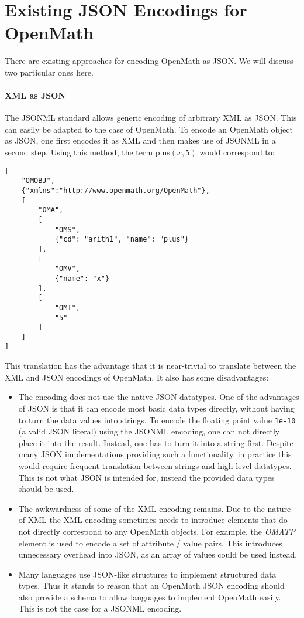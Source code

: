 \section{Existing JSON Encodings for OpenMath}\label{sec:ex}

There are existing approaches for encoding OpenMath as JSON.  We will discuss two
particular ones here.

\paragraph{XML as JSON}
The JSONML standard\cite{jsonml:webpage} allows generic encoding of arbitrary XML as JSON. 
This can easily be adapted to the case of OpenMath. 
To encode an OpenMath object as JSON, one first encodes it as XML and then makes use of JSONML in a second step. 
Using this method, the term $\mathrm{plus}(x, 5)$ would correspond to: 
\begin{lstlisting}
[
    "OMOBJ",
    {"xmlns":"http://www.openmath.org/OpenMath"},
    [
        "OMA",
        [
            "OMS", 
            {"cd": "arith1", "name": "plus"}
        ],
        [
            "OMV", 
            {"name": "x"}
        ],
        [
            "OMI", 
            "5"
        ]
    ]
]
\end{lstlisting}

This translation has the advantage that it is near-trivial to translate between the XML and JSON encodings of OpenMath. 
It also has some disadvantages: 

\begin{itemize}
    \item The encoding does not use the native JSON datatypes. 
    One of the advantages of JSON is that it can encode most basic data types directly, without having to turn the data values into strings. 
    To encode the floating point value \lstinline{1e-10} (a valid JSON literal) using the JSONML encoding, one can not directly place it into the result. 
    Instead, one has to turn it into a string first.   
    Despite many JSON implementations providing such a functionality, in practice this would require frequent translation between strings and high-level datatypes.  
    This is not what JSON is intended for, instead the provided data types should be used. 

    \item The awkwardness of some of the XML encoding remains. 
    Due to the nature of XML the XML encoding sometimes needs to introduce elements that do not directly correspond to any OpenMath objects. 
    For example, the \textit{OMATP} element is used to encode a set of attribute / value pairs. 
    This introduces unnecessary overhead into JSON, as an array of values could be used instead. 

    \item Many languages use JSON-like structures to implement structured data types. 
    Thus it stands to reason that an OpenMath JSON encoding should also provide a schema to allow languages to implement OpenMath easily. This is not the case for a JSONML encoding. 
\end{itemize}


